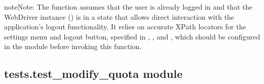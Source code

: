 \documentclass[letterpaper,10pt,english]{sphinxmanual}
\begin{document}
\begin{fulllineitems}
\begin{quote}
\begin{description}
\begin{itemize}
\end{itemize}

\end{description}\end{quote}

\begin{sphinxVerbatim}[commandchars=\\\{\}]
      
      
     
\end{sphinxVerbatim}

\begin{sphinxadmonition}{note}{Note:}
\sphinxAtStartPar
The function assumes that the user is already logged in and that the WebDriver instance () is in a
state that allows direct interaction with the application’s logout functionality. It relies on accurate
XPath locators for the settings menu and logout button, specified in , 
, and , which should be configured in the
 module before invoking this function.
\end{sphinxadmonition}

\end{fulllineitems}



\subsection{tests.test\_modify\_quota module}
\label{\detokenize{tests:module-tests.test_modify_quota}}\label{\detokenize{tests:tests-test-modify-quota-module}}
\end{document}
